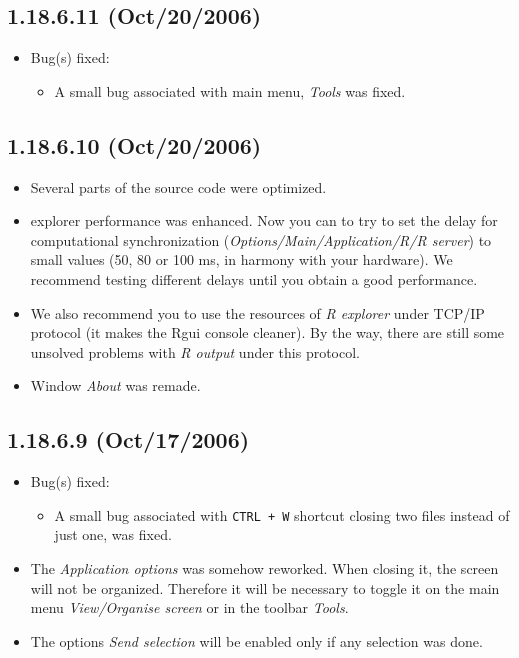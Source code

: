\subsection*{1.18.6.11 (Oct/20/2006)}
\begin{itemize}
  \item Bug(s) fixed:
    \begin{itemize}
      \item A small bug associated with main menu, \textit{Tools} was fixed.
    \end{itemize}
\end{itemize}


\subsection*{1.18.6.10 (Oct/20/2006)}
\begin{itemize}
  \item Several parts of the source code were optimized.
  \item \RR{} explorer performance was enhanced. Now you can to try to set
    the delay for computational synchronization
    (\textit{Options/Main/Application/R/R server}) to small values
    (50, 80 or 100 ms, in harmony with your hardware). We recommend
    testing different delays until you obtain a good performance.
  \item We also recommend you to use the resources of \textit{R explorer}
    under TCP/IP protocol (it makes the Rgui console cleaner). By the way,
    there are still some unsolved problems with \textit{R output} under
    this protocol.
  \item Window \textit{About} was remade.
\end{itemize}


\subsection*{1.18.6.9 (Oct/17/2006)}
\begin{itemize}
  \item Bug(s) fixed:
    \begin{itemize}
      \item A small bug associated with \texttt{CTRL + W} shortcut
        closing two files instead of just one, was fixed.
    \end{itemize}
  \item The \textit{Application options} was somehow reworked.
    When closing it, the screen will not be organized. Therefore it will
    be necessary to toggle it on the main menu \textit{View/Organise screen}
    or in the toolbar \textit{Tools}.
  \item The options \textit{Send selection} will be enabled only if any selection
    was done.
\end{itemize}


